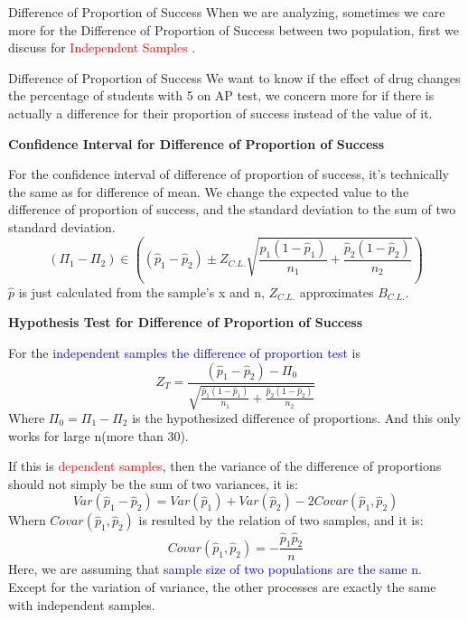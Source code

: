 \vspace{5ex}
\begin{paragraph}{Difference of Proportion of Success}
    When we are analyzing, sometimes we care more for the Difference of Proportion of Success between two population, first we discuss for \textcolor{red}{Independent Samples} . \\
    \begin{examplebox}{Difference of Proportion of Success}
           We want to know if the effect of drug changes the percentage of students with 5 on AP test, we concern more for if there is actually a difference for their proportion of success instead of the value of it.
    \end{examplebox}
 \end{paragraph}
 \vspace{6ex}
 \begin{Center}
     \textbf{Confidence Interval for Difference of Proportion of Success}
 \end{Center}
 For the confidence interval of difference of proportion of success, it's technically the same as for difference of mean. We change the expected value to the difference of proportion of success, and the standard deviation to the sum of two standard deviation.
 \begin{equation}
     (\Pi_1-\Pi_2)\in((\hat{p}_1-\hat{p}_2)\pm Z_{C.L.}\sqrt{\frac{\hat{p}_1(1-\hat{p}_1)}{n_1}+\frac{\hat{p}_2(1-\hat{p}_2)}{n_2}})
 \end{equation}
\(\hat{p}\) is just calculated from the sample's x and n, \(Z_{C.L.}\) approximates \(B_{C.L.}\).
\vspace{5ex}
\begin{Center}
    \textbf{Hypothesis Test for Difference of Proportion of Success}
\end{Center}
For the \textcolor{blue}{independent samples the difference of proportion test} is 
\begin{equation}
    Z_{T}=\frac{(\hat{p}_1-\hat{p}_2)-\Pi_0}{\sqrt{\frac{\hat{p}_1(1-\hat{p}_1)}{n_1}+\frac{\hat{p}_2(1-\hat{p}_2)}{n_2}}}
\end{equation}
Where \(\Pi_0=\Pi_1-\Pi_2\) is the hypothesized difference of proportions. And this only works for large n(more than 30).\\
\vspace{5ex}

If this is \textcolor{red}{dependent samples}, then the variance of the difference of proportions should not simply be the sum of two variances, it is:
\begin{equation}
    Var(\hat{p}_1-\hat{p}_2)=Var(\hat{p}_1)+Var(\hat{p}_2)-2Covar(\hat{p}_1,\hat{p}_2)
\end{equation}
Whern \(Covar(\hat{p}_1,\hat{p}_2)\) is resulted by the relation of two samples, and it is:
\begin{equation}
    Covar(\hat{p}_1,\hat{p}_2)=-\frac{\hat{p}_1\hat{p}_2}{n}
\end{equation}
Here, we are assuming that \textcolor{blue}{sample size of two populations are the same n}. \\
Except for the variation of variance, the other processes are exactly the same with independent samples.